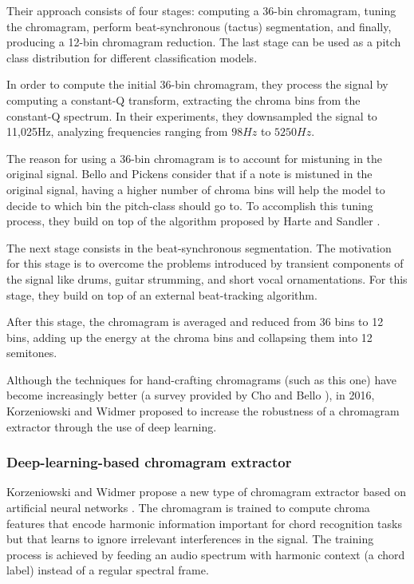 Their approach consists of four stages: computing a 36-bin chromagram, tuning the chromagram, perform beat-synchronous (tactus) segmentation, and finally, producing a 12-bin chromagram reduction. The last stage can be used as a pitch class distribution for different classification models.

In order to compute the initial 36-bin chromagram, they process the signal by computing a constant-Q transform, extracting the chroma bins from the constant-Q spectrum. In their experiments, they downsampled the signal to 11,025Hz, analyzing frequencies ranging from $98Hz$ to $5250Hz$.

The reason for using a 36-bin chromagram is to account for mistuning in the original signal. Bello and Pickens consider that if a note is mistuned in the original signal, having a higher number of chroma bins will help the model to decide to which bin the pitch-class should go to. To accomplish this tuning process, they build on top of the algorithm proposed by Harte and Sandler \cite{harte2005automatic}.

The next stage consists in the beat-synchronous segmentation. The motivation for this stage is to overcome the problems introduced by transient components of the signal like drums, guitar strumming, and short vocal ornamentations. For this stage, they build on top of an external beat-tracking algorithm.

After this stage, the chromagram is averaged and reduced from 36 bins to 12 bins, adding up the energy at the chroma bins and collapsing them into 12 semitones.

Although the techniques for hand-crafting chromagrams (such as this one) have become increasingly better (a survey provided by Cho and Bello \cite{cho2014relative}), in 2016, Korzeniowski and Widmer proposed to increase the robustness of a chromagram extractor through the use of deep learning.

\subsubsection{Deep-learning-based chromagram extractor}
Korzeniowski and Widmer propose a new type of chromagram extractor based on artificial neural networks \cite{korzeniowski2016feature}. The chromagram is trained to compute chroma features that encode harmonic information important for chord recognition tasks but that learns to ignore irrelevant interferences in the signal. The training process is achieved by feeding an audio spectrum with harmonic context (a chord label) instead of a regular spectral frame.

